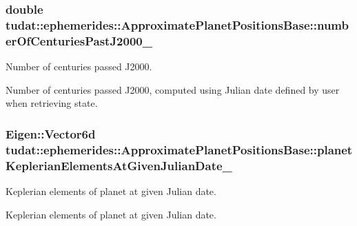 \subsubsection[{\texorpdfstring{number\+Of\+Centuries\+Past\+J2000\+\_\+}{numberOfCenturiesPastJ2000_}}]{\setlength{\rightskip}{0pt plus 5cm}double tudat\+::ephemerides\+::\+Approximate\+Planet\+Positions\+Base\+::number\+Of\+Centuries\+Past\+J2000\+\_\+\hspace{0.3cm}{\ttfamily [protected]}}\hypertarget{classtudat_1_1ephemerides_1_1ApproximatePlanetPositionsBase_aa967cb9533b467af0cf22d5bb5ed8501}{}\label{classtudat_1_1ephemerides_1_1ApproximatePlanetPositionsBase_aa967cb9533b467af0cf22d5bb5ed8501}


Number of centuries passed J2000. 

Number of centuries passed J2000, computed using Julian date defined by user when retrieving state. 
\subsubsection[{\texorpdfstring{planet\+Keplerian\+Elements\+At\+Given\+Julian\+Date\+\_\+}{planetKeplerianElementsAtGivenJulianDate_}}]{\setlength{\rightskip}{0pt plus 5cm}Eigen\+::\+Vector6d tudat\+::ephemerides\+::\+Approximate\+Planet\+Positions\+Base\+::planet\+Keplerian\+Elements\+At\+Given\+Julian\+Date\+\_\+\hspace{0.3cm}{\ttfamily [protected]}}\hypertarget{classtudat_1_1ephemerides_1_1ApproximatePlanetPositionsBase_a872f2535642808c26097146d513a1b3c}{}\label{classtudat_1_1ephemerides_1_1ApproximatePlanetPositionsBase_a872f2535642808c26097146d513a1b3c}


Keplerian elements of planet at given Julian date. 

Keplerian elements of planet at given Julian date. 
